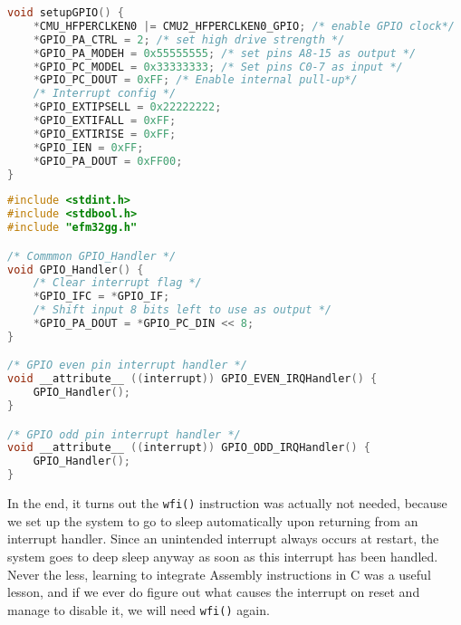 \begin{lstlisting}[language=C, label=EX1-C-gpio, caption=gpio.c]
void setupGPIO() { 
    *CMU_HFPERCLKEN0 |= CMU2_HFPERCLKEN0_GPIO; /* enable GPIO clock*/
    *GPIO_PA_CTRL = 2; /* set high drive strength */
    *GPIO_PA_MODEH = 0x55555555; /* set pins A8-15 as output */
    *GPIO_PC_MODEL = 0x33333333; /* Set pins C0-7 as input */
    *GPIO_PC_DOUT = 0xFF; /* Enable internal pull-up*/
    /* Interrupt config */
    *GPIO_EXTIPSELL = 0x22222222;
    *GPIO_EXTIFALL = 0xFF;
    *GPIO_EXTIRISE = 0xFF;
    *GPIO_IEN = 0xFF;
    *GPIO_PA_DOUT = 0xFF00;
}
\end{lstlisting}

\begin{lstlisting}[language=C, label=EX1-C-interrupt-handler, caption=interrupt_handlers.c]
#include <stdint.h>
#include <stdbool.h>
#include "efm32gg.h"

/* Commmon GPIO_Handler */
void GPIO_Handler() {
    /* Clear interrupt flag */
    *GPIO_IFC = *GPIO_IF;
    /* Shift input 8 bits left to use as output */
    *GPIO_PA_DOUT = *GPIO_PC_DIN << 8;
}

/* GPIO even pin interrupt handler */
void __attribute__ ((interrupt)) GPIO_EVEN_IRQHandler() {
    GPIO_Handler();
}

/* GPIO odd pin interrupt handler */
void __attribute__ ((interrupt)) GPIO_ODD_IRQHandler() {
    GPIO_Handler();
}
\end{lstlisting}

In the end, it turns out the \texttt{wfi()} instruction was actually not needed, because we set up the system to go to sleep automatically upon returning from an interrupt handler. Since an unintended interrupt always occurs at restart, the system goes to deep sleep anyway as soon as this interrupt has been handled. Never the less, learning to integrate Assembly instructions in C was a useful lesson, and if we ever do figure out what causes the interrupt on reset and manage to disable it, we will need \texttt{wfi()} again.
